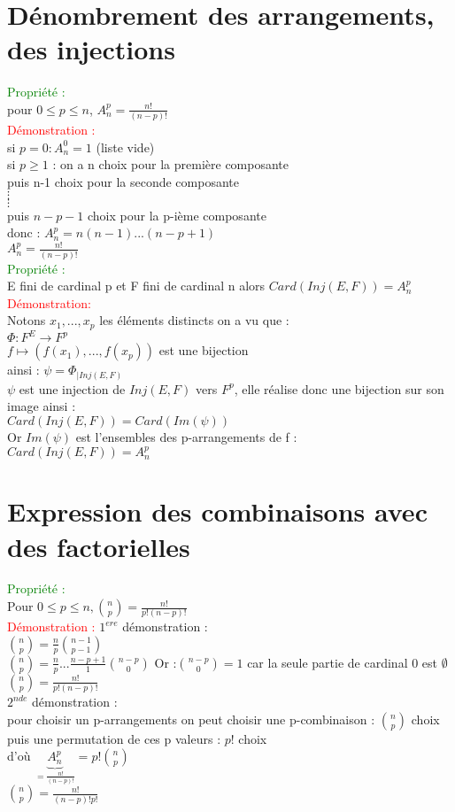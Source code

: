 \documentclass{article}
\begin{document}
\section{Dénombrement des arrangements, des injections}
\textcolor{green}{Propriété : } \\
pour $0 \leq p \leq n $, $A_n^p=\frac{n!}{(n-p)!}$ \\
\textcolor{red}{Démonstration :} \\
si $p=0: A_n^0=1$ (liste vide) \\
si $p \geq 1$ : on a n choix pour la première composante \\
puis n-1 choix pour la seconde composante \\
$\vdots$ \\
$\vdots$ \\
puis $n-p-1$ choix pour la p-ième composante \\
donc : $A_n^p=n(n-1)...(n-p+1)$ \\
$A_n^p=\frac{n!}{(n-p)!}$ \\
\textcolor{green}{Propriété :} \\
E fini de cardinal p et F fini de cardinal n alors $Card(Inj(E,F))=A_n^p$ \\
\textcolor{red}{Démonstration: } \\
Notons $x_1,...,x_p$ les éléments distincts on a vu que : \\
$\Phi : F^E \rightarrow F^p$ \\
$f \mapsto (f(x_1),...,f(x_p))$ est une bijection \\
ainsi : $\psi=\Phi_{|Inj(E,F)} $ \\
$\psi$ est une injection de $Inj(E,F)$ vers $F^p$, elle réalise donc une bijection sur son image ainsi : \\
$Card(Inj(E,F))=Card(Im(\psi))$ \\
Or $Im(\psi)$ est l'ensembles des p-arrangements de f : \\
$Card(Inj(E,F))=A_n^p$
\section{Expression des combinaisons avec des factorielles}
\textcolor{green}{Propriété :} \\
Pour $0 \leq p \leq n , \binom{n}{p}=\frac {n!} {p!(n-p)!}$ \\
\textcolor{red}{Démonstration :} $1^{ere}$ démonstration : \\
$\binom{n}{p}=\frac n p \binom{n-1}{p-1}$ \\
$\binom{n}{p}= \frac n p ... \frac {n-p+1} 1 \binom {n-p} 0$
Or :$\binom {n-p} 0 =1$ car la seule partie de cardinal 0 est $\emptyset$ \\
$\binom n p = \frac {n!} {p!(n-p)!}$ \\
$2^{nde}$ démonstration : \\
pour choisir un p-arrangements on peut choisir une p-combinaison : $\binom n p$ choix puis une permutation de ces p valeurs : $p!$ choix \\
d'où $\underbrace{A_n^p}_{=\frac {n!} {(n-p)!}}=p! \binom n p $ \\
$\binom n p= \frac {n!} {(n-p)! p!}$
\end{document}
